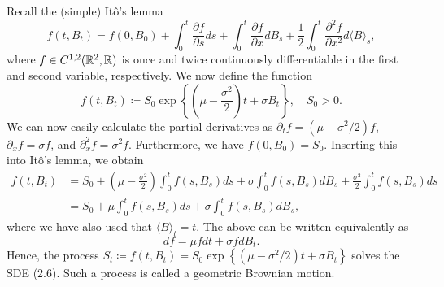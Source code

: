 Recall the (simple) Itô's lemma
\begin{equation}\label{itoslemma}
    f(t,B_{t})= f(0,B_{0})+\int_{0}^{t}\frac{\partial f}{\partial s}ds + \int_{0}^{t}\frac{\partial f}{\partial x}dB_{s}+\frac{1}{2}\int_{0}^{t}\frac{\partial^{2}f}{\partial x^{2}}d\langle B\rangle_{s},
\end{equation}
where $f\in C^{1,2}(\mathbb{R}^{2},\mathbb{R})$ is once and twice continuously differentiable in the first and second variable, respectively. We now define the function
\begin{equation}
    f(t,B_{t})\coloneqq S_{0}\exp\left\{\left(\mu-\frac{\sigma^2}{2}\right)t+\sigma B_{t}\right\},\quad S_{0}>0.
\end{equation}
We can now easily calculate the partial derivatives as $\partial_{t}f=(\mu-\sigma^{2}/2)f$, $\partial_{x}f=\sigma f$, and $\partial^{2}_{x}f=\sigma^{2}f$. Furthermore, we have $f(0,B_{0})=S_{0}$. Inserting this into Itô's lemma, we obtain
\begin{align}
    f(t,B_{t})&=S_{0} + \left(\mu-\frac{\sigma^{2}}{2}\right)\int_{0}^{t}f(s,B_{s})ds+\sigma\int_{0}^{t}f(s,B_{s})dB_{s}+\frac{\sigma^{2}}{2}\int_{0}^{t}f(s,B_{s})ds\\
    &= S_{0}+\mu\int_{0}^{t}f(s,B_{s})ds+\sigma\int_{0}^{t}f(s,B_{s})dB_{s},
\end{align}
where we have also used that $\langle B\rangle_{t}=t$. The above can be written equivalently as
\begin{equation}
    df=\mu fdt+ \sigma fdB_{t}.
\end{equation}
Hence, the process $S_{t}\coloneqq f(t,B_{t})=S_{0}\exp\left\{(\mu-\sigma^{2}/2)t+\sigma B_{t}\right\}$ solves the SDE (2.6). Such a process is called a geometric Brownian motion.


